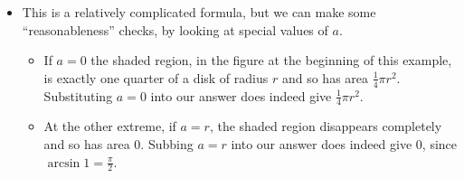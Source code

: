 \begin{eg}
\begin{itemize}
\item This is a relatively complicated formula, but we can make some
``reasonableness'' checks, by looking at special values of $a$.
\begin{itemize}
 \item If $a=0$ the shaded region, in the figure at the beginning of this example,
is exactly one quarter of a disk of radius $r$ and so has area $\frac{1}{4}\pi r^2$.
Substituting $a=0$ into our answer does indeed give $\frac{1}{4}\pi r^2$.
\item At the other extreme, if $a=r$, the shaded region disappears completely and so has
area $0$. Subbing $a=r$ into our answer does indeed give $0$, since $\arcsin
1=\frac{\pi}{2}$.
\end{itemize}
\end{itemize}
\end{eg}


